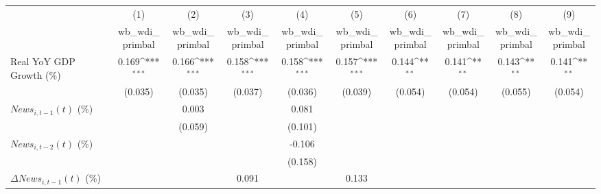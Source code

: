 {
\def\sym#1{\ifmmode^{#1}\else\(^{#1}\)\fi}
\begin{tabular}{l*{9}{c}}
\toprule
                    &\multicolumn{1}{c}{(1)}&\multicolumn{1}{c}{(2)}&\multicolumn{1}{c}{(3)}&\multicolumn{1}{c}{(4)}&\multicolumn{1}{c}{(5)}&\multicolumn{1}{c}{(6)}&\multicolumn{1}{c}{(7)}&\multicolumn{1}{c}{(8)}&\multicolumn{1}{c}{(9)}\\
                    &\multicolumn{1}{c}{wb_wdi_primbal}&\multicolumn{1}{c}{wb_wdi_primbal}&\multicolumn{1}{c}{wb_wdi_primbal}&\multicolumn{1}{c}{wb_wdi_primbal}&\multicolumn{1}{c}{wb_wdi_primbal}&\multicolumn{1}{c}{wb_wdi_primbal}&\multicolumn{1}{c}{wb_wdi_primbal}&\multicolumn{1}{c}{wb_wdi_primbal}&\multicolumn{1}{c}{wb_wdi_primbal}\\
\midrule
Real YoY GDP Growth (\%)&       0.169\sym{***}&       0.166\sym{***}&       0.158\sym{***}&       0.158\sym{***}&       0.157\sym{***}&       0.144\sym{**} &       0.141\sym{**} &       0.143\sym{**} &       0.141\sym{**} \\
                    &     (0.035)         &     (0.035)         &     (0.037)         &     (0.036)         &     (0.039)         &     (0.054)         &     (0.054)         &     (0.055)         &     (0.054)         \\
\addlinespace
$ News_{i,t-1}(t)$ (\%)&                     &       0.003         &                     &       0.081         &                     &                     &                     &                     &                     \\
                    &                     &     (0.059)         &                     &     (0.101)         &                     &                     &                     &                     &                     \\
\addlinespace
$ News_{i,t-2}(t)$ (\%)&                     &                     &                     &      -0.106         &                     &                     &                     &                     &                     \\
                    &                     &                     &                     &     (0.158)         &                     &                     &                     &                     &                     \\
\addlinespace
$ \Delta News_{i,t-1}(t)$ (\%)&                     &                     &       0.091         &                     &       0.133         &                     &                     &                     &                     \\

\end{tabular}}

